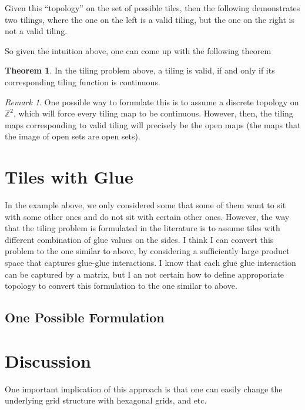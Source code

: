 \documentclass[11pt,a4paper]{article}
\newcommand{\Z}{\mathbb{Z}}
\theoremstyle{definition}
\theoremstyle{remark}
\newtheorem{remark}{Remark}
\theoremstyle{definition}
\newtheorem{theorem}{Theorem}
\begin{document}
	
	
	Given this ``topology'' on the set of possible tiles, then the following demonstrates two tilings, where the one on the left is a valid tiling, but the one on the right is not a valid tiling.
	
	
	
	\FloatBarrier
	
	So given the intuition above, one can come up with the following theorem
	
	\begin{theorem}
		In the tiling problem above, a tiling is valid, if and only if its corresponding tiling function is continuous.
	\end{theorem}
	
	
	
	\begin{remark}
		One possible way to formulate this is to assume a discrete topology on $ \Z^2 $, which will force every tiling map to be continuous. However, then, the tiling maps corresponding to valid tiling will precisely be the open maps (the maps that the image of open sets are open sets). 
	\end{remark}
	
	
	\section{Tiles with Glue}
	
	In the example above, we only considered some that some of them want to sit with some other ones and do not sit with certain other ones. However, the way that the tiling problem is formulated in the literature is to assume tiles with different combination of glue values on the sides. I think I can convert this problem to the one similar to above, by considering a sufficiently large product space that captures glue-glue interactions. I know that each glue glue interaction can be captured by a matrix, but I an not certain how to define approporiate topology to convert this formulation to the one similar to above.
	
	
	\subsection{One Possible Formulation}
	
	
	
	
	\section{Discussion}
	One important implication of this approach is that one can easily change the underlying grid structure with hexagonal grids, and etc. 
	
\end{document}
